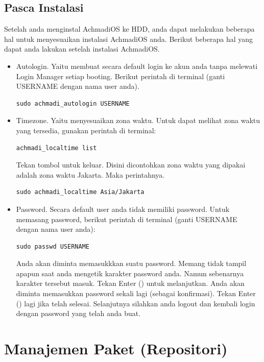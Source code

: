 \documentclass[12pt,]{article}
\begin{document}
	\newpage	
	\subsection{Pasca Instalasi}
	
	Setelah anda menginstal AchmadiOS ke HDD, anda dapat melakukan beberapa hal untuk menyesuaikan instalasi AchmadiOS anda.
	Berikut beberapa hal yang dapat anda lakukan setelah instalasi AchmadiOS.
	\begin{itemize}
		\item Autologin. Yaitu membuat secara default login ke akun anda tanpa melewati Login Manager setiap booting.
		Berikut perintah di terminal (ganti USERNAME dengan nama user anda).
		\begin{verbatim}
sudo achmadi_autologin USERNAME
		\end{verbatim}
		
		\item Timezone. Yaitu menyesuaikan zona waktu.
		Untuk dapat melihat zona waktu yang tersedia, gunakan perintah di terminal:
		\begin{verbatim}
achmadi_localtime list
		\end{verbatim}
		Tekan tombol  untuk keluar.
		Disini dicontohkan zona waktu yang dipakai adalah zona waktu Jakarta.
		Maka perintahnya.
		\begin{verbatim}
sudo achmadi_localtime Asia/Jakarta
		\end{verbatim}
		
		\item Password. Secara default user anda tidak memiliki password.
		Untuk memasang password, berikut perintah di terminal (ganti USERNAME dengan nama user anda):
		\begin{verbatim}
sudo passwd USERNAME
		\end{verbatim}		 
		Anda akan diminta memasukkkan suatu password.
		Memang tidak tampil apapun saat anda mengetik karakter password anda.
		Namun sebenarnya karakter tersebut masuk.
		Tekan Enter (\keys{\return}) untuk melanjutkan.
		Anda akan diminta memasukkan password sekali lagi (sebagai konfirmasi).
		Tekan Enter (\keys{\return}) lagi jika telah selesai.
		Selanjutnya silahkan anda logout dan kembali login dengan password yang telah anda buat.
	\end{itemize}

	\newpage
	\section{Manajemen Paket (Repositori)}
	
\end{document}
